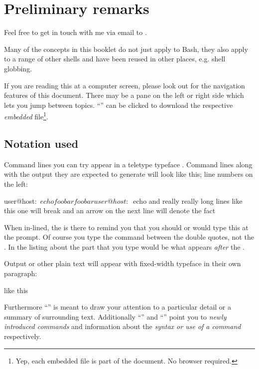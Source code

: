 \documentclass{olli-handout}
\begin{document}
\section{Preliminary remarks}

Feel free to get in touch with me via email to .

\begin{hintbox}
    {\olliHandLeft} Many of the concepts in this booklet do not just apply to Bash, they also apply to a range of other shells and have been reused in other places, e.g. shell globbing.
\end{hintbox}

If you are reading this at a computer screen, please look out for the navigation features of this document. There may be a pane on the left or right side which lets you jump between topics. ``\olliDownload'' can be clicked to download the respective \emph{embedded} file\footnote{Yep, each embedded file is part of the document. No browser required.}.

\subsection{Notation used}

Command lines you can try appear in a teletype typeface . Command lines along with the output they are expected to generate will look like this; line numbers on the left:

\begin{lstbash}
user@host:~$ echo foo bar
foo bar
user@host:~$ echo and really really long lines like this one will break and an arrow on the next line will denote the fact
\end{lstbash}

When in-lined, the {\term} is there to remind you that you should or would type this at the prompt. Of course you type the command between the double quotes, not the {\term}. In the listing about the part that you type would be what appears \emph{after} the \TTQ{\mytilde\textdollar}.

Output or other plain text will appear with fixed-width typeface in their own paragraph:

\begin{GenericListing}
like this
\end{GenericListing}

Furthermore ``{\olliHandLeft}'' is meant to draw your attention to a particular detail or a summary of surrounding text. Additionally ``{\olliPenRD}'' and ``{\olliPenR}'' point you to \emph{newly introduced commands} and information about the \emph{syntax or use of a command} respectively.
\end{document}

